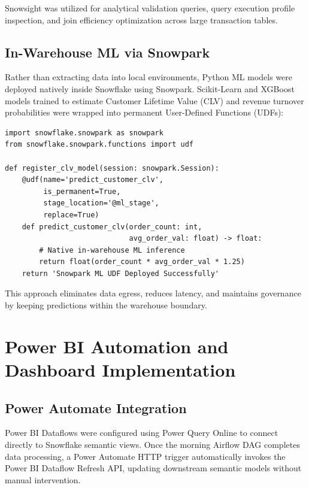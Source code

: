 \documentclass[11pt,a4paper]{article}
\begin{document}
Snowsight was utilized for analytical validation queries, query execution profile inspection, and join efficiency optimization across large transaction tables.

\subsection{In-Warehouse ML via Snowpark}

Rather than extracting data into local environments, Python ML models were deployed natively inside Snowflake using Snowpark. Scikit-Learn and XGBoost models trained to estimate Customer Lifetime Value (CLV) and revenue turnover probabilities were wrapped into permanent User-Defined Functions (UDFs):

\begin{lstlisting}[caption={Snowpark Python UDF deployment for CLV prediction.}]
import snowflake.snowpark as snowpark
from snowflake.snowpark.functions import udf

def register_clv_model(session: snowpark.Session):
    @udf(name='predict_customer_clv',
         is_permanent=True,
         stage_location='@ml_stage',
         replace=True)
    def predict_customer_clv(order_count: int,
                             avg_order_val: float) -> float:
        # Native in-warehouse ML inference
        return float(order_count * avg_order_val * 1.25)
    return 'Snowpark ML UDF Deployed Successfully'
\end{lstlisting}

This approach eliminates data egress, reduces latency, and maintains governance by keeping predictions within the warehouse boundary.

\section{Power BI Automation and Dashboard Implementation}

\subsection{Power Automate Integration}

Power BI Dataflows were configured using Power Query Online to connect directly to Snowflake semantic views. Once the morning Airflow DAG completes data processing, a Power Automate HTTP trigger automatically invokes the Power BI Dataflow Refresh API, updating downstream semantic models without manual intervention.
\end{document}
